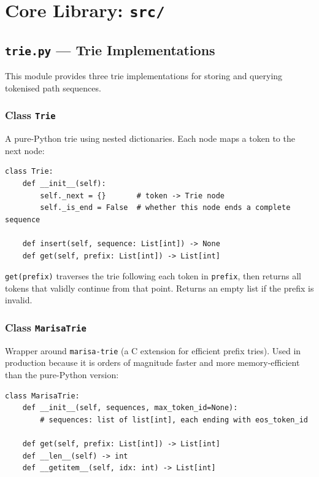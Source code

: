 \documentclass[11pt,a4paper,oneside,openany]{book}
\theoremstyle{definition}
\newcommand{\code}[1]{\texttt{#1}}
\newcommand{\pkg}[1]{\texttt{#1}}
\begin{document}
\chapter{Core Library: \texttt{src/}}\label{ch:src}

\section{\texttt{trie.py} --- Trie Implementations}

This module provides three trie implementations for storing and querying tokenised path sequences.

\subsection{Class \texttt{Trie}}

A pure-Python trie using nested dictionaries. Each node maps a token to the next node:

\begin{lstlisting}
class Trie:
    def __init__(self):
        self._next = {}       # token -> Trie node
        self._is_end = False  # whether this node ends a complete sequence

    def insert(self, sequence: List[int]) -> None
    def get(self, prefix: List[int]) -> List[int]
\end{lstlisting}

\code{get(prefix)} traverses the trie following each token in \code{prefix}, then returns all tokens that validly continue from that point. Returns an empty list if the prefix is invalid.

\subsection{Class \texttt{MarisaTrie}}

Wrapper around \pkg{marisa-trie} (a C extension for efficient prefix tries). Used in production because it is orders of magnitude faster and more memory-efficient than the pure-Python version:

\begin{lstlisting}
class MarisaTrie:
    def __init__(self, sequences, max_token_id=None):
        # sequences: list of list[int], each ending with eos_token_id

    def get(self, prefix: List[int]) -> List[int]
    def __len__(self) -> int
    def __getitem__(self, idx: int) -> List[int]
\end{lstlisting}
\end{document}
